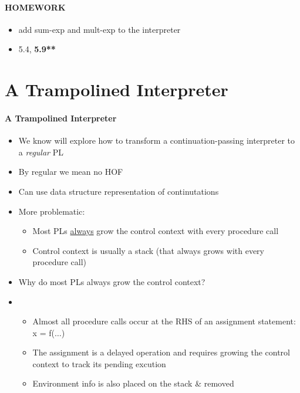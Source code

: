 \documentclass{beamer}
\newcommand{\dotss}{\(\ldots\)}
\begin{document}
\begin{frame}[fragile]
\framesubtitle{HOMEWORK}
\begin{scriptsize}
\begin{itemize}
\item<1-> add sum-exp and mult-exp to the interpreter

\item<1-> 5.4, \textbf{5.9**}


\end{itemize}
\end{scriptsize}
\end{frame}

\section{A Trampolined Interpreter}

\begin{frame}[fragile]
\framesubtitle{A Trampolined Interpreter}
\begin{scriptsize}
\begin{itemize}
\item<1-> We know will explore how to transform a continuation-passing interpreter to a \emph{regular} PL
    
\item<1-> By regular we mean no HOF

\item<1-> Can use data structure representation of continutations

\item<2-> More problematic:
\begin{itemize}
\item Most PLs \underline{always} grow the control context with every procedure call
    
\item Control context is usually a stack (that always grows with every procedure call)
\end{itemize}

\item<3-> Why do most PLs always grow the control context?

\item<4-> 
\begin{itemize}
\item Almost all procedure calls occur at the RHS of an assignment statement: x = f(\dotss)
    
\item The assignment is a delayed operation and requires growing the control context to track its pending excution
    
\item Environment info is also placed on the stack \& removed

\end{itemize}

\end{itemize}
\end{scriptsize}
\end{frame}
\end{document}
